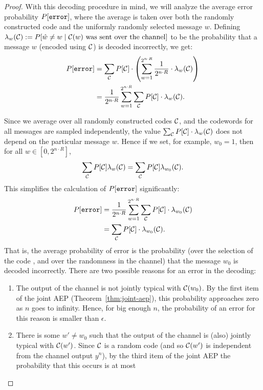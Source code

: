 \begin{proof}
With this decoding procedure in mind, we will analyze the average error probability $P[\texttt{error}]$, where the average is taken over both the randomly constructed code \cran and the uniformly randomly selected message $w$. Defining $\lambda_w(\mathcal{C}) := P[\hat{w} \neq w \mid \mathcal{C}(w) \text{ was sent over the channel}]$ to be the probability that a message $w$ (encoded using $\mathcal{C}$) is decoded incorrectly, we get:
\begin{align}
P[\texttt{error}] &= \sum_{\mathcal{C}} P[\mathcal{C}] \cdot \left(\sum_{w=1}^{2^{n\cdot R}} \frac{1}{2^{n \cdot R}} \cdot \lambda_w(\mathcal{C}) \right)\nonumber\\
&= \frac{1}{2^{n \cdot R}} \sum_{w = 1}^{2^{n \cdot R}} \sum_{\mathcal{C}} P[\mathcal{C}] \cdot \lambda_w(\mathcal{C}).\label{eq:prob-error}
\end{align}

Since we average over all randomly constructed codes $\mathcal{C}$, and the codewords for all messages are sampled independently, the value $\sum_{\mathcal{C}} P[\mathcal{C}] \cdot \lambda_w(\mathcal{C})$ does not depend on the particular message $w$. Hence if we set, for example, $w_0 = 1$, then for all $w \in [0,2^{n \cdot R}]$,
\begin{align}
\sum_{\mathcal{C}} P[\mathcal{C}] \lambda_w(\mathcal{C}) = \sum_{\mathcal{C}} P[\mathcal{C}] \lambda_{w_0}(\mathcal{C}).
\end{align}
This simplifies the calculation of $P[\texttt{error}]$ significantly:
\begin{align}
P[\texttt{error}] &= \frac{1}{2^{n \cdot R}} \sum_{w = 1}^{2^{n \cdot R}} \sum_{\mathcal{C}} P[\mathcal{C}] \cdot \lambda_{w_0}(\mathcal{C})\nonumber\\
&= \sum_{\mathcal{C}} P[\mathcal{C}] \cdot \lambda_{w_0}(\mathcal{C}).
\end{align}
That is, the average probability of error is the probability (over the selection of the code \cran, and over the randomness in the channel) that the message $w_0$ is decoded incorrectly. There are two possible reasons for an error in the decoding:
\begin{enumerate}
\item The output of the channel is not jointly typical with $\mathcal{C}(w_0)$. By the first item of the joint AEP (Theorem~\ref{thm:joint-aep}), this probability approaches zero as $n$ goes to infinity. Hence, for big enough $n$, the probability of an error for this reason is smaller than $\epsilon$.
\item There is some $w' \neq w_0$ such that the output of the channel is (also) jointly typical with $\mathcal{C}(w')$. Since $\mathcal{C}$ is a random code (and so $\mathcal{C}(w')$ is independent from the channel output $y^n$), by the third item of the joint AEP the probability that this occurs is at most

\end{enumerate}
\end{proof}
